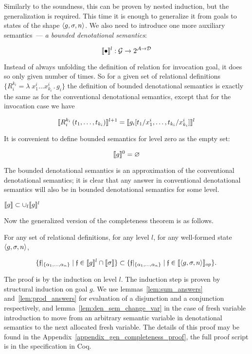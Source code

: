 Similarly to the soundness, this can be proven by nested induction, but the generalization is required. This time it is enough to generalize it from goals
to states of the shape $\left<{g, \sigma, n}\right>$. We also need to introduce one more auxiliary semantics~--- \emph{a bounded denotational semantics}:

\[
\llbracket{\bullet}\rrbracket^l : \mathcal{G} \to 2^{\mathcal{A}\to\mathcal{D}}
\]

Instead of always unfolding the definition of relation for invocation goal, it does so only given number of times. So for a given set of relational
definitions $\{R_i^{k_i} = \lambda\;x_1^i\dots x_{k_i}^i\,.\, g_i\}$ the definition of bounded denotational semantics is exactly the same as for the conventional denotational semantics, except that for the invocation case we have

\[
\llbracket{R_i^{k_i}\,(t_1,\dots,t_{k_i})}\rrbracket^{l+1} = \llbracket{g_i[t_1/x_1^i, \dots, t_{k_i}/x_{k_i}^i]}\rrbracket^{l}
\]

It is convenient to define bounded semantics for level zero as the empty set:

\[
\llbracket{g}\rrbracket^{0} = \varnothing
\]

The bounded denotational semantics is an approximation of the conventional denotational semantics; it is clear that any answer in conventional denotational semantics will also be in bounded denotational semantics for some level.

\begin{lemma}
$\llbracket{g}\rrbracket \subset \cup_l \llbracket{g}\rrbracket^l$
\end{lemma}

Now the generalized version of the completeness theorem is as follows.

\begin{lemma}
\label{lem:gen_completeness}
For any set of relational definitions, for any level $l$, for any well-formed state $\left<{g, \sigma, n}\right>$,

\[
\{\mathfrak{f}|_{\{\alpha_1,\dots,\alpha_n\}} \mid \mathfrak{f} \in \llbracket{g}\rrbracket^l \cap \llbracket{\sigma}\rrbracket\} \subset \{\mathfrak{f}|_{\{\alpha_1,\dots,\alpha_n\}} \mid \mathfrak{f} \in \llbracket{\left<{g, \sigma, n}\right>}\rrbracket_{op}\}.
\]
\end{lemma}

The proof is by the induction on level $l$. The induction step is proven by structural induction on goal $g$. We use lemmas~\ref{lem:sum_answers} and~\ref{lem:prod_answers} for evaluation of a disjunction and a conjunction respectively, and lemma~\ref{lem:den_sem_change_var} in the case of fresh variable introduction to move from an arbitrary semantic variable in denotational semantics to the next allocated fresh variable. The details of this proof may be found in the Appendix~\ref{appendix_gen_completeness_proof}, the full proof script is in the specification in Coq.
